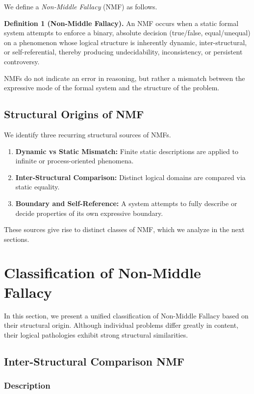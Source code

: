 \documentclass[11pt]{article}
\begin{document}
We define a \emph{Non-Middle Fallacy} (NMF) as follows.

\medskip
\noindent
\textbf{Definition 1 (Non-Middle Fallacy).}
An NMF occurs when a static formal system attempts to enforce a binary,
absolute decision (true/false, equal/unequal) on a phenomenon whose
logical structure is inherently dynamic, inter-structural, or
self-referential, thereby producing undecidability, inconsistency,
or persistent controversy.
\medskip

NMFs do not indicate an error in reasoning, but rather a mismatch
between the expressive mode of the formal system and the structure
of the problem.

\subsection{Structural Origins of NMF}

We identify three recurring structural sources of NMFs.

\begin{enumerate}
\item \textbf{Dynamic vs Static Mismatch:}
  Finite static descriptions are applied to infinite or
  process-oriented phenomena.
\item \textbf{Inter-Structural Comparison:}
  Distinct logical domains are compared via static equality.
\item \textbf{Boundary and Self-Reference:}
  A system attempts to fully describe or decide properties of
  its own expressive boundary.
\end{enumerate}

These sources give rise to distinct classes of NMF, which we analyze
in the next sections.


\section{Classification of Non-Middle Fallacy}

In this section, we present a unified classification of Non-Middle Fallacy
based on their structural origin.
Although individual problems differ greatly in content, their logical
pathologies exhibit strong structural similarities.

\subsection{Inter-Structural Comparison NMF}

\subsubsection{Description}
\end{document}
